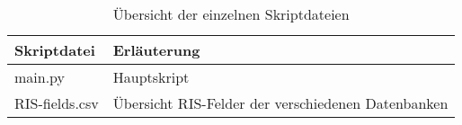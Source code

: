 \clearpage
\begin{appendices}
\label{appendix}
\begin{table}[h]
\caption{Übersicht der einzelnen Skriptdateien}
    \begin{tabularx}{1\textwidth}{p{5cm}p{9cm}}
    \toprule
     Skriptdatei & Erläuterung \\
     \midrule
main.py & Hauptskript\\
RIS-fields.csv & Übersicht RIS-Felder der verschiedenen Datenbanken\\
%
    \bottomrule
    \end{tabularx}
\end{table}


\end{appendices}

